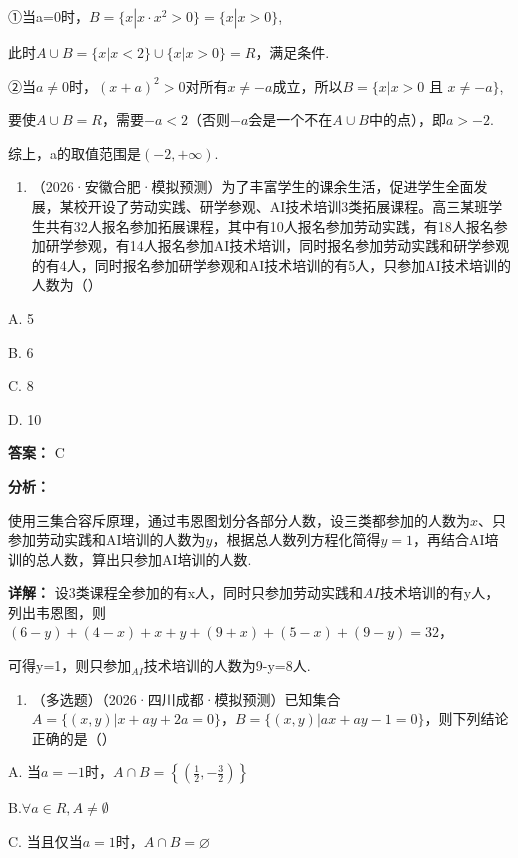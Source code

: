 \documentclass[11pt,a4paper]{ctexart}
\begin{document}
①当a=0时，\(B=\{x|x\cdot x^{2}>0\}=\{x|x>0\}\),

此时\(A \cup B = \{x | x < 2\} \cup \{x | x > 0\} = R\)，满足条件.

②当\(a \neq 0\)时，\((x + a)^{2} > 0\)对所有\(x \neq -a\)成立，所以\(B = \{x | x > 0 \text{ 且 } x \neq -a\}\),

要使\(A \cup B = R\)，需要\(-a < 2\)（否则\(-a\)会是一个不在\(A \cup B\)中的点），即\(a > -2\).

综上，a的取值范围是\((-2,+\infty)\).

\begin{enumerate}[label=\arabic*., leftmargin=*, start=6]
\item （2026·安徽合肥·模拟预测）为了丰富学生的课余生活，促进学生全面发展，某校开设了劳动实践、研学参观、AI技术培训3类拓展课程。高三某班学生共有32人报名参加拓展课程，其中有10人报名参加劳动实践，有18人报名参加研学参观，有14人报名参加AI技术培训，同时报名参加劳动实践和研学参观的有4人，同时报名参加研学参观和AI技术培训的有5人，只参加AI技术培训的人数为（）
\end{enumerate}

A. 5

B. 6

C. 8

D. 10

\textbf{答案：}
C

\textbf{分析：}

使用三集合容斥原理，通过韦恩图划分各部分人数，设三类都参加的人数为\(x\)、只参加劳动实践和\(\mathrm{AI}\)培训的人数为\(y\)，根据总人数列方程化简得\(y = 1\)，再结合\(\mathrm{AI}\)培训的总人数，算出只参加\(\mathrm{AI}\)培训的人数.

\textbf{详解：}
设3类课程全参加的有x人，同时只参加劳动实践和\(AI\)技术培训的有y人，列出韦恩图，则\((6-y)+(4-x)+x+y+(9+x)+(5-x)+(9-y)=32\)，

可得y=1，则只参加\(_{AI}\)技术培训的人数为9-y=8人.

\begin{enumerate}[label=\arabic*., leftmargin=*, start=7]
\item （多选题）（2026·四川成都·模拟预测）已知集合\(A = \{(x, y) | x + ay + 2a = 0\}\)，\(B = \{(x, y) | ax + ay - 1 = 0\}\)，则下列结论正确的是（）
\end{enumerate}

A.
当\(a = -1\)时，\(A\cap B=\left\{\left(\frac12,-\frac32\right)\right\}\)

B.\(\forall a \in R, A \neq \emptyset\)

C. 当且仅当\(a = 1\)时，\(A \cap B = \varnothing\)
\end{document}
